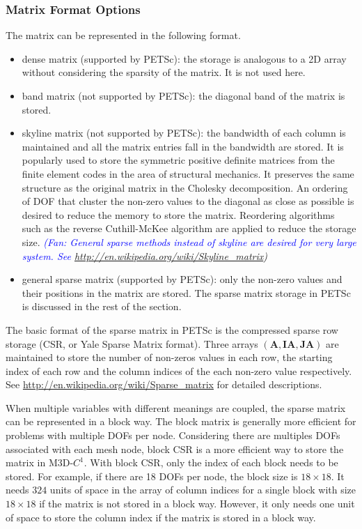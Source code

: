 \documentclass[11pt]{article}  %
\begin{document}
\subsubsection{Matrix Format Options} \label{sec:petscMatStore}
The matrix can be represented in the following format.
\begin{itemize}
\item dense matrix (supported by PETSc):  the storage is analogous to a 2D array without considering the sparsity of the matrix. It is not used here.
\item band matrix (not supported by PETSc): the diagonal band of the matrix is stored. 
\item skyline matrix (not supported by PETSc):  the bandwidth of each column is maintained and all the matrix entries fall in the bandwidth are stored. It \cite{watkins2004fundamentals} is popularly used to store the symmetric positive definite matrices from the finite element codes in the area of structural mechanics. It preserves the same structure as the original matrix  in  the Cholesky decomposition.  An ordering of DOF that cluster the non-zero values to the diagonal as close as possible is desired to reduce the memory to store the matrix.   Reordering algorithms such as the reverse Cuthill-McKee algorithm \cite{cuthill1969reducing} are applied to reduce the storage size. 
\textit{\textcolor{blue}{(Fan: General sparse methods instead of skyline are desired for very large system. See \url{http://en.wikipedia.org/wiki/Skyline_matrix}})}
\item general sparse matrix (supported by PETSc): only the non-zero values and their positions in the matrix are stored. The sparse matrix storage in PETSc is discussed in the rest of the section.
\end{itemize}

The basic format of the sparse matrix in PETSc \cite{petsc-web-page} is the  compressed sparse row storage (CSR, or Yale Sparse Matrix format).  Three arrays $(\mathbf{A}, \mathbf{IA}, \mathbf{JA})$ are maintained to store the number of non-zeros values in each row, the starting index of each row and the column indices of the each non-zero value respectively.  See \url{http://en.wikipedia.org/wiki/Sparse_matrix}  for detailed descriptions. 

When multiple  variables with different meanings are coupled, the sparse matrix can be  represented in a block way.  The block matrix is generally more efficient for problems with multiple DOFs per node. Considering there are multiples DOFs  associated with each mesh node,  block CSR is a more efficient way to store the matrix in M3D-$C^1$.  With block CSR, only the index of each block needs to be stored. For example, if there are 18 DOFs per node, the block size  is $18\times18$. It needs $324$ units of space in the array of column indices for a single block with size $18\times18$ if the matrix is not stored in a block way. However, it only needs one unit of space to store the column index if the matrix is stored in a block way.  
\end{document}
